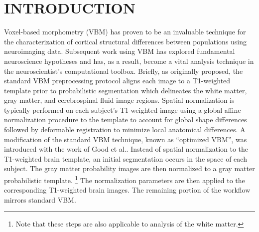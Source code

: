 \documentclass[]{spie}  %
\begin{document}


\section{INTRODUCTION}
\label{sec:intro}  %

Voxel-based morphometry (VBM) \cite{wright1995,Ashburner2000} has proven to be
an invaluable technique for the characterization of cortical structural differences 
between populations using neuroimaging data.  Subsequent work
using VBM has explored fundamental neuroscience hypotheses and
has, as a result, become a vital analysis technique in the
neuroscientist's computational toolbox.  
Briefly, as originally proposed, the standard VBM preprocessing protocol aligns each image to a
T1-weighted template prior to probabilistic segmentation which delineates the white matter, gray matter, 
and cerebrospinal fluid image regions.  Spatial normalization is typically performed on
each subject's T1-weighted image using a global affine normalization procedure to the template
to account for global shape differences followed by deformable registration
to minimize local anatomical differences.  A modification of the standard VBM technique, 
known as ``optimized VBM'', was introduced with the work of Good et al.\cite{Good2001}.  
Instead of spatial normalization to the T1-weighted brain template, an initial 
segmentation occurs in the space of each subject.   The gray matter probability images are then 
normalized to a gray matter
probabilistic template.%
\footnote{
Note that these steps are also applicable to analysis of the white matter.
}  
The normalization parameters are then applied to the corresponding T1-weighted brain 
images.  The remaining portion of the workflow mirrors standard VBM.  
\end{document}
